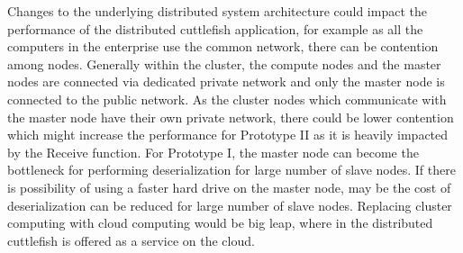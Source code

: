 Changes to the underlying distributed system architecture could impact the performance of the distributed cuttlefish application, for example as all the computers in the enterprise use the common network, there can be contention among nodes. Generally within the cluster, the compute nodes and the master nodes are connected via dedicated private network and only the master node is connected to the public network. As the cluster nodes which communicate with the master node have their own private network, there could be lower contention which might increase the performance for Prototype II as it is heavily impacted by the Receive function. For Prototype I, the master node can become the bottleneck for performing deserialization for large number of slave nodes. If there is possibility of using a faster hard drive on the master node, may be the cost of deserialization can be reduced for large number of slave nodes. Replacing cluster computing with cloud computing would be big leap, where in the distributed cuttlefish is offered as a service on the cloud. \newline   
